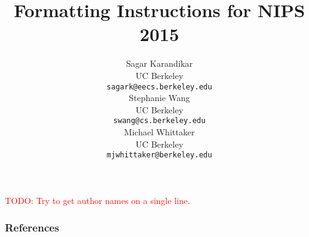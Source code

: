 \documentclass{article}
\title{Formatting Instructions for NIPS 2015}
\author{%
  Sagar Karandikar \\
  UC Berkeley\\
  \texttt{sagark@eecs.berkeley.edu} \\
  \And{}
  Stephanie Wang \\
  UC Berkeley\\
  \texttt{swang@cs.berkeley.edu} \\
  \And{}
  Michael Whittaker \\
  UC Berkeley \\
  \texttt{mjwhittaker@berkeley.edu} \\
}
\newcommand{\todo}[1]{\textcolor{red}{TODO: #1}}
\begin{document}
\maketitle
\todo{Try to get author names on a single line.}

{}
{}
{}
{}
{}
{}
{}

\subsubsection*{References}


\end{document}
